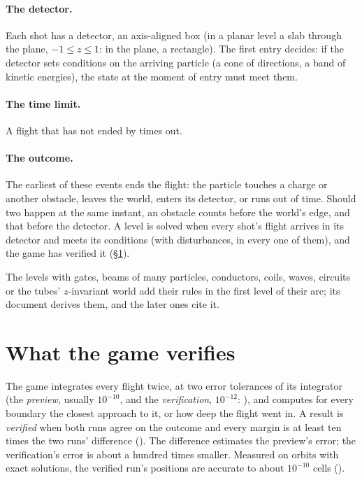 \documentclass{leveldoc}
\begin{document}
\paragraph{The detector.} Each shot has a detector, an axis-aligned box (in a planar level a
slab through the plane, $-1\le z\le 1$: in the plane, a rectangle). The first entry decides:
if the detector sets conditions on the arriving particle (a cone of directions, a band of
kinetic energies), the state at the moment of entry must meet them.

\paragraph{The time limit.} A flight that has not ended by  times out.

\paragraph{The outcome.} The earliest of these events ends the flight: the particle touches
a charge or another obstacle, leaves the world, enters its detector, or runs out of time.
Should two happen at the same instant, an obstacle counts before the world's edge, and that
before the detector. A level is solved when every shot's flight arrives in its detector and
meets its conditions (with disturbances, in every one of them), and the game has verified it
(§\ref{sec:verification}).

The levels with gates, beams of many particles, conductors, coils, waves, circuits or the
tubes' $z$-invariant world add their rules in the first level of their arc; its document
derives them, and the later ones cite it.

\section{What the game verifies}\label{sec:verification}

The game integrates every flight twice, at two error tolerances of its integrator (the
\emph{preview}, usually $10^{-10}$, and the \emph{verification}, $10^{-12}$:
), and computes for every boundary the closest approach to it, or
how deep the flight went in. A result is \emph{verified} when both runs agree on the
outcome and every margin is at least ten times the two runs' difference
(). The difference estimates the preview's error; the verification's error is
about a hundred times smaller. Measured on orbits with exact solutions, the verified run's
positions are accurate to about $10^{-10}$ cells ().
\end{document}

